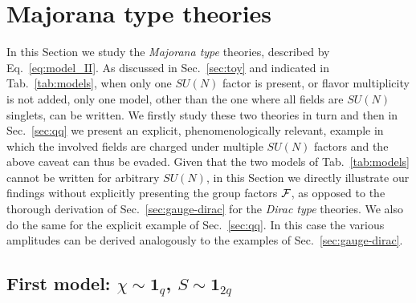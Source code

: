 \documentclass[a4paper,11pt]{article}
\begin{document}
\section{Majorana type theories}\label{sec:gauge-majo}

In this Section we study the {\emph{Majorana type}} theories, described by Eq.~\eqref{eq:model_II}.
As discussed in Sec.~\ref{sec:toy} and indicated in Tab.~\ref{tab:models}, when only one $SU(N)$ factor is present, or flavor multiplicity is not added, only one model, other than the one where all fields are $SU(N)$ singlets, can be written. We firstly study these two theories in turn and then in Sec.~\ref{sec:qq} we present an explicit, phenomenologically relevant, example in which the involved fields are charged under multiple $SU(N)$ factors and the above caveat can thus be evaded. Given that the two models of Tab.~\ref{tab:models} cannot be written for arbitrary $SU(N)$, in this Section we directly illustrate our findings without explicitly presenting the group factors ${\cal F}$, as opposed to the thorough derivation of Sec.~\ref{sec:gauge-dirac} for the {\emph{Dirac type}} theories. We also do the same for the explicit example of Sec.~\ref{sec:qq}. In this case the various amplitudes can be derived analogously to the examples of Sec.~\ref{sec:gauge-dirac}.

\subsection{First model: $\chi\sim {\mathbf{1}}_q$, $S \sim {\mathbf{1}}_{2q}$}
\end{document}
